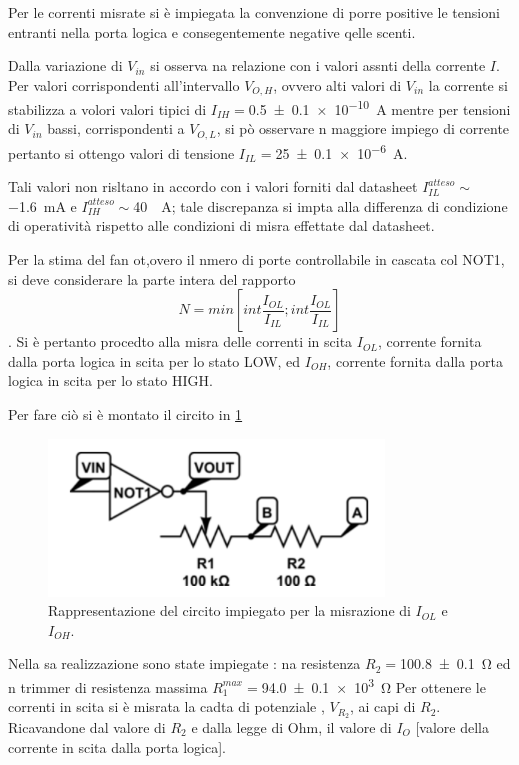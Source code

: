 	
	Per le correnti misrate si è impiegata la convenzione di porre positive le tensioni entranti nella porta  logica e consegentemente negative qelle scenti.
	
	Dalla variazione di  $V_{in}$ si osserva na relazione con i valori assnti della corrente $I$.
	Per valori corrispondenti all'intervallo $V_{O,H}$, ovvero alti valori di 	$V_{in}$
	la corrente si stabilizza a volori valori tipici di $I_{IH}=$\SI{0.5\pm 0.1 e-10}{\ampere}
	mentre per tensioni di $V_{in}$ bassi, corrispondenti a $V_{O,L}$, si pò
	osservare n maggiore impiego di corrente pertanto si ottengo valori di tensione $I_{IL}=$\SI{25 \pm 0.1 e-6}{\ampere}.
	
	Tali valori non risltano in accordo con i valori forniti dal datasheet 
	$I_{IL}^{atteso}\sim$\SI{-1.6}{\milli \ampere} e $I_{IH}^{atteso}\sim$\SI{40}{\mu \ampere}; tale discrepanza si impta alla differenza di condizione di operatività rispetto alle condizioni di misra effettate dal datasheet.
	
	Per la stima del fan ot,overo il nmero di porte controllabile in cascata col NOT1, si deve considerare la parte intera del rapporto \begin{equation}
	N=min[int \frac{I_{OL}}{I_{IL}};int \frac{I_{OL}}{I_{IL}}]
		\end{equation}\label{eq:fan-o}
		.
	Si è pertanto procedto alla misra delle correnti in scita $I_{OL}$, corrente fornita dalla porta logica in scita per lo stato LOW, ed $I_{OH}$, corrente fornita dalla porta logica in scita per lo stato HIGH.
	
	Per fare ciò si è montato  il circito in \figurename{ \ref{f:c2} }
	\begin{center}
		\begin{figure}[h]
			\includegraphics[scale=0.75]{../immagine/cir2.png}
			\caption{Rappresentazione del circito impiegato per la misrazione di $I_{OL}$ e $I_{OH}$. }
			\label{f:c2}
		\end{figure}
	\end{center}
	Nella sa realizzazione sono state impiegate : na resistenza $R_{2}=$\SI{100.8 \pm 0.1}{\ohm} ed n trimmer di resistenza massima $R_{1}^{max}=$\SI{94.0 \pm 0.1 e3}{\ohm}
	Per ottenere le correnti in scita  si è misrata la cadta di potenziale , $V_{R_{2}}$, ai capi di $R_{2}$.
	Ricavandone dal valore di $R_{2}$ e dalla legge di Ohm, il valore di $I_{O}$ [valore della corrente in scita dalla porta logica].
	
